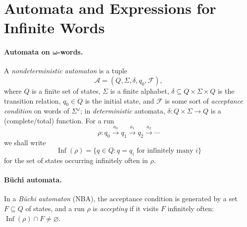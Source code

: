 \documentclass[11pt,a4paper]{tutorial}
\newcommand{\Lang}{\mathcal{L}}
\let\L=\Lang
\begin{document}
\maketitle




\section{Automata and Expressions for Infinite Words}

\paragraph{Automata on $\symbf{\omega}$-words.}
A \emph{nondeterministic automaton} is a tuple
\[
\mathcal A=(Q,\Sigma,\delta,q_0,\mathscr{F}),
\]
where $Q$ is a finite set of states, $\Sigma$ is a finite alphabet,
$\delta\subseteq Q\times\Sigma\times Q$ is the transition relation,
$q_0\in Q$ is the initial state, and $\mathscr{F}$ is some sort of \emph{acceptance condition}
on words of $\Sigma^\omega$;
in \emph{deterministic} automata, $\delta : Q \times \Sigma \to Q$ 
is a (complete/total) function.
For a run
\[
\rho : q_0\xrightarrow{a_0}q_1\xrightarrow{a_1}q_2
\xrightarrow{a_2}\cdots
\]
we shall write
\[
\operatorname{Inf}(\rho)
=
\{q\in Q:q=q_i\text{ for infinitely many }i\}
\]
for the set of states occurring infinitely often in $\rho$.


\paragraph{Büchi automata.} 
In a \emph{Büchi automaton} (NBA), 
the acceptance condition is generated by a set $F \subseteq Q$ of states,
and 
a run $\rho$
is \emph{accepting} if it visits $F$ infinitely often:
$\operatorname{Inf}(\rho)\cap F \neq \varnothing$.
\end{document}
